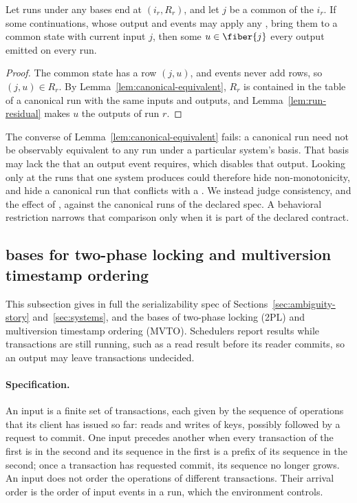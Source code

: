 \begin{corollary}
\label{cor:reconciliation-any-basis}
Let runs under any \commitment bases end at $(i_r,R_r)$, and let $j$ be a
common \indesc of the $i_r$.  If some continuations, whose output and \commitment events
may apply any \commitments, bring them to a common state with current input $j$,
then some $u\in\fiber{j}$ \outrel every output emitted on every run.
\end{corollary}

\begin{proof}
The common state has a row $(j,u)$, and events never add rows, so
$(j,u)\in R_r$.  By Lemma~\ref{lem:canonical-equivalent}, $R_r$ is contained in
the table of a canonical run with the same inputs and outputs, and
Lemma~\ref{lem:run-residual} makes $u$ \outrel the outputs of run $r$.
\end{proof}

The converse of Lemma~\ref{lem:canonical-equivalent} fails: a canonical run
need not be observably equivalent to any run under a particular system's
basis.  That basis may lack the \commitment that an output event requires,
which disables that output.  Looking only at the runs that one system produces
could therefore hide non-monotonicity, and hide a canonical run that conflicts
with a \commitment.  We instead judge consistency, and the effect of
\commitments, against the canonical runs of the declared spec.  A behavioral
restriction narrows that comparison only when it is part of the declared
contract.

\subsection{\Commitment bases for two-phase locking and multiversion timestamp ordering}
\label{app:cc-bases}

This subsection gives in full the serializability spec of
Sections~\ref{sec:ambiguity-story} and~\ref{sec:systems}, and the \commitment
bases of two-phase locking (2PL) and multiversion timestamp ordering (MVTO).
Schedulers report results while transactions are still running, such as a
read result before its reader commits, so an output may leave transactions
undecided.

\paragraph{Specification.}
An input is a finite set of transactions, each given by the sequence of
operations that its client has issued so far: reads and writes of keys,
possibly followed by a request to commit.  One input precedes another when
every transaction of the first is in the second and its sequence in the first
is a prefix of its sequence in the second; once a transaction has requested
commit, its sequence no longer grows.  An input does not order the operations
of different transactions.  Their arrival order is the order of input events
in a run, which the environment controls.

